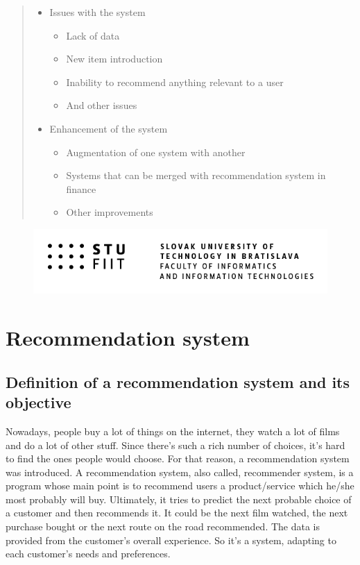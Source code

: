 \documentclass[10pt,twoside,english,a4paper]{article}
\begin{document}
\begin{abstract}
\begin{itemize}
    \item Issues with the system
    \begin{itemize}
        \item Lack of data
        \item New item introduction
        \item Inability to recommend anything relevant to a user
        \item And other issues
    \end{itemize}
    
    \item Enhancement of the system
    \begin{itemize}
        \item Augmentation of one system with another
        \item Systems that can be merged with recommendation system in finance
        \item Other improvements
    \end{itemize}\cite{arch_rec_sys}
\end{itemize}


\end{abstract}

\tableofcontents

\begin{figure}[h!]
    \centering
    \includegraphics[width=1\textwidth]{STU-FIIT-anch}
\end{figure}

\newpage






\section{Recommendation system}

\subsection{Definition of a recommendation system and its objective}
Nowadays, people buy a lot of things on the internet, they watch a lot of films and do a lot of other stuff. Since there's such a rich number of choices, it's hard to find the ones people would choose. For that reason, a recommendation system was introduced. A recommendation system, also called, recommender system, is a program whose main point is to recommend users a product/service which he/she most probably will buy. Ultimately, it tries to predict the next probable choice of a customer and then recommends it. It could be the next film watched, the next purchase bought or the next route on the road recommended. The data is provided from the customer's overall experience. So it's a system, adapting to each customer's needs and preferences.\cite{vars_rec_sys}
\end{document}
